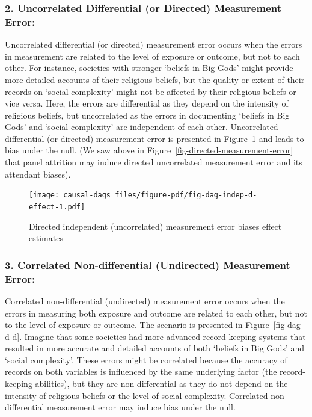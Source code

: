 \documentclass[
  singlecolumn]{report}
\begin{document}
\hypertarget{uncorrelated-differential-or-directed-measurement-error}{%
\subsubsection{\texorpdfstring{2. \textbf{Uncorrelated Differential (or
Directed) Measurement
Error:}}{2. Uncorrelated Differential (or Directed) Measurement Error:}}\label{uncorrelated-differential-or-directed-measurement-error}}

Uncorrelated differential (or directed) measurement error occurs when
the errors in measurement are related to the level of exposure or
outcome, but not to each other. For instance, societies with stronger
`beliefs in Big Gods' might provide more detailed accounts of their
religious beliefs, but the quality or extent of their records on `social
complexity' might not be affected by their religious beliefs or vice
versa. Here, the errors are differential as they depend on the intensity
of religious beliefs, but uncorrelated as the errors in documenting
`beliefs in Big Gods' and `social complexity' are independent of each
other. Uncorrelated differential (or directed) measurement error is
presented in Figure~\ref{fig-dag-indep-d-effect} and leads to bias under
the null. (We saw above in Figure~\ref{fig-directed-measurement-error}
that panel attrition may induce directed uncorrelated measurement error
and its attendant biases).

\begin{figure}

{\centering \texttt{[image: causal-dags\_files/figure-pdf/fig-dag-indep-d-effect-1.pdf]}

}

\caption{\label{fig-dag-indep-d-effect}Directed independent
(uncorrelated) measurement error biases effect estimates}

\end{figure}

\hypertarget{correlated-non-differential-undirected-measurement-error}{%
\subsubsection{\texorpdfstring{3. \textbf{Correlated Non-differential
(Undirected) Measurement
Error:}}{3. Correlated Non-differential (Undirected) Measurement Error:}}\label{correlated-non-differential-undirected-measurement-error}}

Correlated non-differential (undirected) measurement error occurs when
the errors in measuring both exposure and outcome are related to each
other, but not to the level of exposure or outcome. The scenario is
presented in Figure~\ref{fig-dag-d-d}. Imagine that some societies had
more advanced record-keeping systems that resulted in more accurate and
detailed accounts of both `beliefs in Big Gods' and `social complexity'.
These errors might be correlated because the accuracy of records on both
variables is influenced by the same underlying factor (the
record-keeping abilities), but they are non-differential as they do not
depend on the intensity of religious beliefs or the level of social
complexity. Correlated non-differential measurement error may induce
bias under the null.
\end{document}
